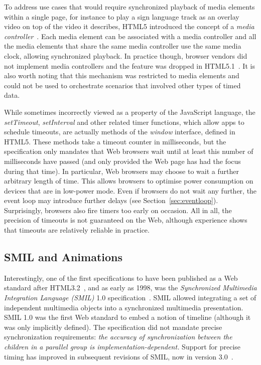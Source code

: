 \documentclass[graybox]{svmult}
\begin{document}
To address use cases that would require synchronized playback of media
elements within a single page, for instance to play a sign language track as
an overlay video on top of the video it describes, HTML5 introduced the
concept of a \emph{media controller}~\cite{mediacontroller}. Each media
element can be associated with a media controller and all the media elements
that share the same media controller use the same media clock, allowing
synchronized playback. In practice though, browser vendors did not implement
media controllers and the feature was dropped in HTML5.1~\cite{html51}. It is
also worth noting that this mechanism was restricted to media elements and
could not be used to orchestrate scenarios that involved other types of timed
data.

While sometimes incorrectly viewed as a property of the JavaScript language,
the \emph{setTimeout}, \emph{setInterval} and other related timer functions,
which allow apps to schedule timeouts, are actually methods of the
\emph{window} interface, defined in HTML5. These methods take a timeout
counter in milliseconds, but the specification only mandates that Web browsers
wait until at least this number of milliseconds have passed (and only provided
the Web page has had the focus during that time). In particular, Web browsers
may choose to wait a further arbitrary length of time. This allows browsers to
optimise power consumption on devices that are in low-power mode. Even if
browsers do not wait any further, the event loop may introduce further delays
(see Section~\ref{sec:eventloop}). Surprisingly, browsers also fire timers too
early on occasion. All in all, the precision of timeouts is not guaranteed on
the Web, although experience shows that timeouts are relatively reliable in
practice.

\subsection{SMIL and Animations}
\label{sec:smil}

Interestingly, one of the first specifications to have been published as a Web
standard after HTML3.2~\cite{html32}, and as early as 1998, was the
\emph{Synchronized Multimedia Integration Language (SMIL)} 1.0
specification~\cite{smil1}. SMIL allowed integrating a set of independent
multimedia objects into a synchronized multimedia presentation. SMIL 1.0 was
the first Web standard to embed a notion of timeline (although it was only
implicitly defined). The specification did not mandate precise synchronization
requirements: \emph{the accuracy of synchronization between the children in a
parallel group is implementation-dependent.} Support for precise timing has
improved in subsequent revisions of SMIL, now in version 3.0~\cite{smil3}.
\end{document}
